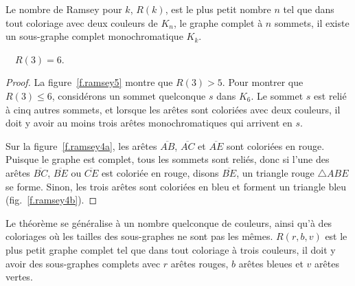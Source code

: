 \vspace{0.4cm}





\begin{definition}
 Le nombre de Ramsey pour $k$,  $R(k)$, est le plus petit nombre $n$ tel que dans tout coloriage avec deux couleurs de $K_{n}$, le graphe complet à $n$ sommets,  il existe un sous-graphe complet monochromatique $K_k$.
\end{definition}


\begin{theorem}[Ramsey]
$\quad R(3)=6$.\label{thm.ramsey}
\end{theorem}

\begin{proof} 
La figure~\ref{f.ramsey5} montre que $R(3)>5$. Pour montrer que $R(3)\leq 6$, considérons un sommet quelconque $s$ dans $K_6$. Le sommet $s$ est relié à cinq autres sommets, et lorsque les arêtes sont coloriées avec deux couleurs, il doit y avoir au moins trois arêtes monochromatiques qui arrivent en $s$. 

Sur la figure~\ref{f.ramsey4a}, les arêtes $\overline{AB}$, $\overline{AC}$ et $\overline{AE}$ sont coloriées en rouge. Puisque le graphe est complet, tous les sommets sont reliés, donc si l'une des arêtes $\overline{BC}$, $\overline{BE}$ ou $\overline{CE}$ est coloriée en rouge, disons $\overline{BE}$, un triangle rouge $\triangle ABE$ se forme. Sinon, les trois arêtes sont coloriées en bleu et forment un triangle bleu (fig.~\ref{f.ramsey4b}).
\end{proof}

Le théorème se généralise à un nombre quelconque de couleurs, ainsi qu'à des coloriages où les tailles des sous-graphes ne sont pas les mêmes. $R(r,b,v)$ est le plus petit graphe complet tel que dans tout coloriage à trois couleurs, il doit y avoir des sous-graphes complets avec $r$ arêtes rouges, $b$ arêtes bleues et $v$ arêtes vertes.

\vspace{0.4cm}

